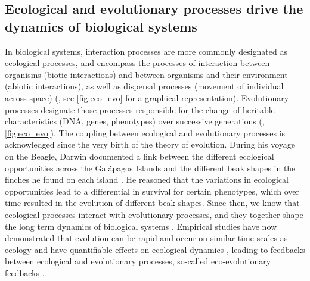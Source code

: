\subsection{Ecological and evolutionary processes drive the dynamics of biological systems}
% 
%
% 
In biological systems, interaction processes are more commonly designated as ecological processes, and encompass the processes of interaction between organisms (biotic interactions) and between organisms and their environment (abiotic interactions), as well as dispersal processes (movement of individual across space) (\cite{Vellend2010a}, see \cref{fig:eco_evo} for a graphical representation).
% 
Evolutionary processes designate those processes responsible for the change of heritable characteristics (DNA, genes, phenotypes) over successive generations (\citep{Hall2013}, \cref{fig:eco_evo}).
% 
The coupling between ecological and evolutionary processes is acknowledged since the very birth of the theory of evolution. 
% 
During his voyage on the Beagle, Darwin documented a link between the different ecological opportunities across the Galápagos Islands and the different beak shapes in the finches he found on each island \citep{darwin2004origin}.
% 
He reasoned that the variations in ecological opportunities lead to a differential in survival for certain phenotypes, which over time resulted in the evolution of different beak shapes.
% 
Since then, we know that ecological processes interact with evolutionary processes, and they together shape the long term dynamics of biological systems \citep{Rahbek2019a,Rangel2018,Hagen}.
% 
Empirical studies have now demonstrated that evolution can be rapid and occur on similar time scales as ecology \citep{Hairston2005, Pelletier2009} and have quantifiable effects on ecological dynamics \citep{Ezard2009}, leading to feedbacks between ecological and evolutionary processes, so-called eco-evolutionary feedbacks \citep{Pelletier2009,Schoener2011,Govaert2019}. 
